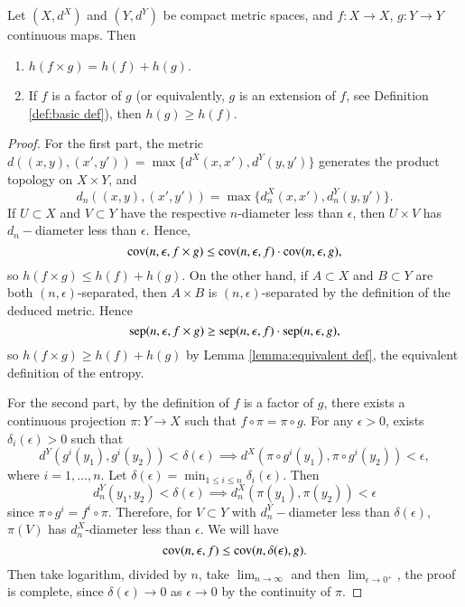 \documentclass[12pt,a4paper]{article}
\begin{document}
	\begin{proposition}{}{}
		Let $(X,d^X)$ and $(Y,d^Y)$ be compact metric spaces, and $f:X\rightarrow X$, $g:Y\rightarrow Y$ continuous maps. Then
		\begin{enumerate}
			\item $h(f\times g)=h(f)+h(g)$.
			\item If $f$ is a factor of $g$ (or equivalently, $g$ is an extension of $f$, see Definition \ref{def:basic def}), then $h(g)\geq h(f)$.
		\end{enumerate}
	\end{proposition}
	\begin{proof}
		For the first part, the metric $d((x,y),(x',y'))=\max\{d^X (x,x'), d^Y(y,y')\}$ generates the product topology on $X\times Y$, and
		$$
		d_n((x,y),(x',y'))=\max\{d_n^X (x,x'), d_n^Y(y,y')\}.
		$$
		If $U\subset X$ and $V\subset Y$ have the respective $n$-diameter less than $\epsilon$, then $U\times V$ has $d_n-$diameter less than $\epsilon$. Hence,
		$$
		\text{cov}(n,\epsilon,f\times g) \leq \text{cov}(n,\epsilon,f)\cdot \text{cov}(n,\epsilon,g),
		$$
		so $h(f\times g)\leq h(f)+h(g)$. On the other hand, if $A\subset X$ and $B\subset Y$ are both $(n,\epsilon)$-separated, then $A\times B$ is $(n,\epsilon)$-separated by the definition of the deduced metric. Hence
		$$
		\text{sep}(n,\epsilon,f\times g)\geq \text{sep}(n,\epsilon,f)\cdot \text{sep}(n,\epsilon,g),
		$$
		so $h(f\times g)\geq h(f)+h(g)$ by Lemma \ref{lemma:equivalent def}, the equivalent definition of the entropy.
		
		For the second part, by the definition of $f$ is a factor of $g$, there exists a continuous projection $\pi: Y\rightarrow X$ such that $f\circ \pi=\pi \circ g$. For any $\epsilon>0$, exists $\delta_i(\epsilon)>0$ such that 
		$$d^Y(g^i(y_1),g^i(y_2))<\delta(\epsilon)\implies d^X(\pi\circ g^i(y_1),\pi\circ g^i(y_2))<\epsilon,$$
		 where $i=1,\dots,n$. Let $\delta(\epsilon)=\min_{1\leq i\leq n}\delta_i(\epsilon)$. Then $$d^Y_n(y_1,y_2)<\delta(\epsilon)\implies d^X_n (\pi(y_1),\pi(y_2))<\epsilon$$ 
		 since $\pi \circ g^i = f^i \circ \pi$. Therefore, for $V\subset Y$ with $d^Y_n-$diameter less than $\delta(\epsilon)$, $\pi(V)$ has $d^X_n$-diameter less than $\epsilon$. We will have
		$$
		\text{cov}(n,\epsilon,f)\leq \text{cov}(n,\delta(\epsilon),g).
		$$
		Then take logarithm, divided by $n$, take $\lim_{n\to\infty}$ and then $\lim_{\epsilon\to 0^+}$, the proof is complete, since $\delta(\epsilon)\to 0$ as $\epsilon\to0$ by the continuity of $\pi$.
	\end{proof}
	
\end{document}
